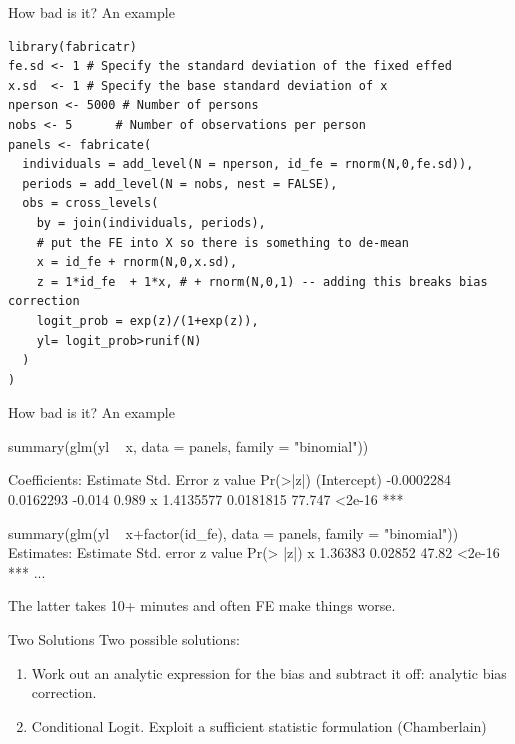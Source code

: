 \documentclass[xcolor=pdftex,dvipsnames,table,mathserif,aspectratio=169]{beamer}
\begin{document}
\begin{frame}[fragile]{How bad is it? An example}
\scriptsize
\begin{verbatim}
library(fabricatr)
fe.sd <- 1 # Specify the standard deviation of the fixed effed
x.sd  <- 1 # Specify the base standard deviation of x
nperson <- 5000 # Number of persons
nobs <- 5      # Number of observations per person
panels <- fabricate(
  individuals = add_level(N = nperson, id_fe = rnorm(N,0,fe.sd)),
  periods = add_level(N = nobs, nest = FALSE),
  obs = cross_levels(
    by = join(individuals, periods),
    # put the FE into X so there is something to de-mean
    x = id_fe + rnorm(N,0,x.sd),
    z = 1*id_fe  + 1*x, # + rnorm(N,0,1) -- adding this breaks bias correction
    logit_prob = exp(z)/(1+exp(z)),
    yl= logit_prob>runif(N)
  )
)
\end{verbatim}
\end{frame}


\begin{frame}[fragile]{How bad is it? An example}
\scriptsize
\begin{semiverbatim}
summary(glm(yl ~ x, data = panels, family = "binomial"))

Coefficients:
              Estimate Std. Error z value Pr(>|z|)    
(Intercept) -0.0002284  0.0162293  -0.014    0.989    
x            \alert{1.4135577}  0.0181815  77.747   <2e-16 ***

summary(glm(yl ~ x+factor(id_fe), data = panels, family = "binomial"))
Estimates:
  Estimate Std. error z value Pr(> |z|)    
x  \alert{1.36383}    0.02852   47.82    <2e-16 ***
...
\end{semiverbatim}
The latter takes 10+ minutes and often FE make things worse.
\end{frame}

\begin{frame}{Two Solutions}
Two possible solutions:
\begin{enumerate}
\item Work out an analytic expression for the bias and subtract it off: \alert{analytic bias correction}.
\item Conditional Logit. Exploit a \alert{sufficient statistic} formulation (Chamberlain)
\end{enumerate}
\end{frame}
\end{document}
